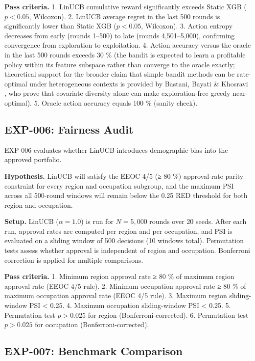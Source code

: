 \textbf{Pass criteria.}
1. LinUCB cumulative reward significantly exceeds Static XGB (\(p < 0.05\), Wilcoxon).
2. LinUCB average regret in the last 500 rounds is significantly lower than Static XGB (\(p < 0.05\), Wilcoxon).
3. Action entropy decreases from early (rounds 1--500) to late (rounds 4,501--5,000), confirming convergence from exploration to exploitation.
4. Action accuracy versus the oracle in the last 500 rounds exceeds 30 \% (the bandit is expected to learn a profitable policy within its feature subspace rather than converge to the oracle exactly; theoretical support for the broader claim that simple bandit methods can be rate-optimal under heterogeneous contexts is provided by Bastani, Bayati \& Khosravi \citeyearpar{Bastani2021}, who prove that covariate diversity alone can make exploration-free greedy near-optimal).
5. Oracle action accuracy equals 100 \% (sanity check).

\subsection{EXP-006: Fairness Audit}\label{exp-006-fairness-audit}

EXP-006 evaluates whether LinUCB introduces demographic bias into the approved portfolio.

\textbf{Hypothesis.} LinUCB will satisfy the EEOC 4/5 (≥ 80 \%) approval-rate parity constraint for every region and occupation subgroup, and the maximum PSI across all 500-round windows will remain below the 0.25 RED threshold for both region and occupation.

\textbf{Setup.} LinUCB (\(\alpha = 1.0\)) is run for \(N = 5,000\) rounds over 20 seeds. After each run, approval rates are computed per region and per occupation, and PSI is evaluated on a sliding window of 500 decisions (10 windows total). Permutation tests assess whether approval is independent of region and occupation. Bonferroni correction is applied for multiple comparisons.

\textbf{Pass criteria.}
1. Minimum region approval rate ≥ 80 \% of maximum region approval rate (EEOC 4/5 rule).
2. Minimum occupation approval rate ≥ 80 \% of maximum occupation approval rate (EEOC 4/5 rule).
3. Maximum region sliding-window PSI \textless{} 0.25.
4. Maximum occupation sliding-window PSI \textless{} 0.25.
5. Permutation test \(p > 0.025\) for region (Bonferroni-corrected).
6. Permutation test \(p > 0.025\) for occupation (Bonferroni-corrected).

\subsection{EXP-007: Benchmark Comparison}\label{exp-007-benchmark-comparison}


